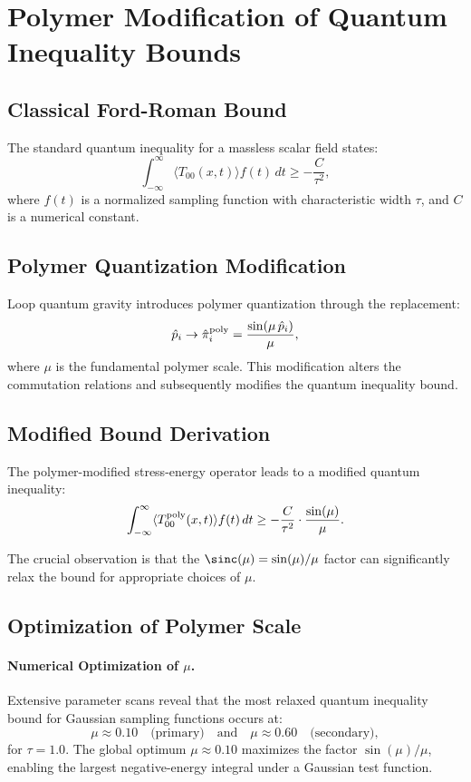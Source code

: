 \documentclass[11pt]{article}
\begin{document}
\section*{Polymer Modification of Quantum Inequality Bounds}

\subsection*{Classical Ford-Roman Bound}
The standard quantum inequality for a massless scalar field states:
\[
  \int_{-\infty}^{\infty} \langle T_{00}(x,t) \rangle f(t)\,dt \geq -\frac{C}{\tau^2},
\]
where $f(t)$ is a normalized sampling function with characteristic width $\tau$, and $C$ is a numerical constant.

\subsection*{Polymer Quantization Modification}
Loop quantum gravity introduces polymer quantization through the replacement:
\[
  \hat{p}_i \rightarrow \hat{\pi}_i^{\rm poly} = \frac{\sin(\mu\,\hat{p}_i)}{\mu},
\]
where $\mu$ is the fundamental polymer scale. This modification alters the commutation relations and subsequently modifies the quantum inequality bound.

\subsection*{Modified Bound Derivation}
The polymer-modified stress-energy operator leads to a modified quantum inequality:
\[
  \int_{-\infty}^{\infty} \langle T_{00}^{\rm poly}(x,t) \rangle f(t)\,dt \geq -\frac{C}{\tau^2} \cdot \frac{\sin(\mu)}{\mu}.
\]

The crucial observation is that the $\sinc(\mu) = \sin(\mu)/\mu$ factor can significantly relax the bound for appropriate choices of $\mu$.

\subsection*{Optimization of Polymer Scale}
\paragraph{Numerical Optimization of $\mu$.}
Extensive parameter scans reveal that the most relaxed quantum inequality bound for Gaussian sampling functions occurs at:
\[
  \mu \approx 0.10 \quad\text{(primary)}\quad\text{and}\quad \mu \approx 0.60 \quad\text{(secondary)},
\]
for $\tau = 1.0$. The global optimum $\mu \approx 0.10$ maximizes the factor $\sin(\mu)/\mu$, enabling the largest negative-energy integral under a Gaussian test function.
\end{document}

